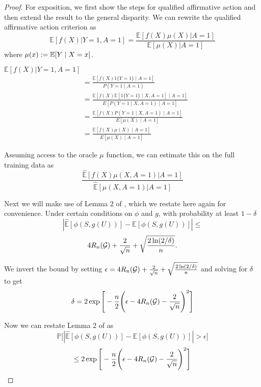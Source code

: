 \documentclass{article}
\begin{document}
\begin{proof}
For exposition, we first show the steps for qualified affirmative action and then extend the result to the general disparity.
We can rewrite the qualified affirmative action criterion as
\begin{equation}
    \mathbb{E}[f(X) | Y = 1, A = 1] = \frac{\mathbb{E}[f(X) \mu(X) | A = 1]}{\mathbb{E}[ \mu(X) | A = 1]}
\end{equation} 
where  $\mu(x) := \mathbb{E}[Y \mid X = x]$.


$   \mathbb{E}[f(X) | Y = 1, A = 1] $
\begin{eqnarray}
  & =  \frac{\mathbb{E}[f(X) 1\{ Y = 1\} \mid A = 1]}{P(Y = 1 \mid A = 1)} \\
      & =  \frac{\mathbb{E}[f(X) \mathbb{E} [ 1\{ Y = 1\} \mid X, A = 1] \mid A = 1]}{E[P(Y = 1 \mid X, A = 1) \mid A =1]} \\
        & =  \frac{\mathbb{E}[f(X) P(Y = 1 \mid X, A = 1) \mid A = 1]}{E[\mu(X) \mid A =1]} \\
        & =  \frac{\mathbb{E}[f(X) \mu(X) \mid A = 1]}{E[\mu(X) \mid A =1]}
\end{eqnarray}

Assuming access to the oracle $\mu$ function, we can estimate this on the full training data as
\begin{equation}
     \frac{\mathbb{\hat E}[f(X) \mu(X, A = 1) | A = 1]}{\mathbb{\hat E}[ \mu(X, A = 1) | A = 1]}
\end{equation}

Next we will make use of Lemma 2 of \cite{AgarwalEtAl(19)-FairRegression}, which we restate here again for convenience. Under certain conditions on $\phi$ and $g$, with probability at least $1- \delta$
\[
\left| \hat{\mathbb{E}}\left[ \phi(S, g(U)) \right] - \mathbb{E}\left[ \phi(S, g(U)) \right]   \right| \leq 
\]
\[
4 R_n(\mathcal{G}) + \frac{2}{\sqrt{n}} + \sqrt{ \frac{2 \ln(2/\delta)}{n}  }.
\]

We invert the bound by setting $\epsilon  = 4 R_n(\mathcal{G}) + \frac{2}{\sqrt{n}} + \sqrt{ \frac{2 \ln(2/\delta)}{n}} $ and solving for $\delta$ to get
\begin{equation}
\delta = 
    2\exp\Bigg[-\frac{n}{2}\Bigg(\epsilon  - 4 R_n(\mathcal{G}) - \frac{2}{\sqrt{n}}\Bigg)^2 \Bigg]
\end{equation}
     
Now we can restate Lemma 2 of \cite{AgarwalEtAl(19)-FairRegression} as 
\begin{equation} \label{eq:lemma2_restated}
   \mathbb{P}\Big[ \left| \hat{\mathbb{E}}\left[ \phi(S, g(U)) \right] - \mathbb{E}\left[ \phi(S, g(U)) \right]   \right| > \epsilon \Big]
\end{equation}
\[
\leq 2\exp\Bigg[-\frac{n}{2}\Bigg(\epsilon  - 4 R_n(\mathcal{G}) - \frac{2}{\sqrt{n}}\Bigg)^2 \Bigg]
\]


\end{proof}
\end{document}
